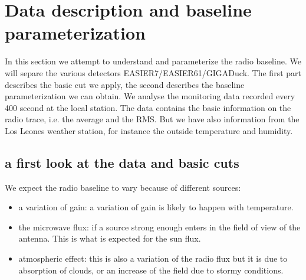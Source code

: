\section{Data description and baseline parameterization}
In this  section we attempt  to understand and parameterize  the radio
baseline.      We     will     separe    the     various     detectors
EASIER7/EASIER61/GIGADuck.  The first part  describes the basic cut we
apply,  the  second describes  the  baseline  parameterization we  can
obtain.  We analyse  the monitoring data recorded every  400 second at
the local  station.  The  data contains the  basic information  on the
radio  trace,  i.e.   the average  and  the  RMS.   But we  have  also
information  from the  Los Leones  weather station,  for  instance the
outside temperature and humidity.
\newpage
\subsection{a first look at the data and basic cuts}
We expect the radio baseline to vary because of different sources:
\begin{itemize}
\item a  variation of gain:  a variation of  gain is likely  to happen
  with temperature.
\item  the microwave flux:  if a  source strong  enough enters  in the
  field of view  of the antenna. This is what is  expected for the sun
  flux.
\item atmospheric effect:  this is also a variation  of the radio flux
  but it is  due to absorption of clouds, or an  increase of the field
  due to stormy conditions.
\end{itemize}
